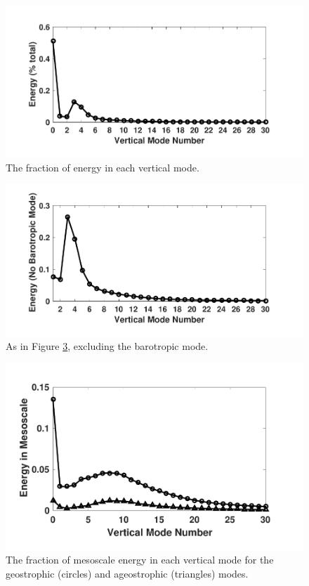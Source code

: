 \begin{figure}[H]
\includegraphics[scale=1]{Chapter4/img/modal_energy}
\caption{The fraction of energy in each vertical mode.}
\label{fig:modal_energy}
\end{figure}
\vspace{-0.2in}
\begin{figure}[H]
\includegraphics[scale=1]{Chapter4/img/modal_energy_nobaro}
\caption{As in Figure \ref{fig:meso_GeoAgeo},  excluding the barotropic mode.}
\label{fig:modal_energy_nobaro}
\end{figure}

\begin{figure}[H]
\vspace{0cm}
\includegraphics[scale=1]{Chapter4/img/meso_GeoAgeo}
\vspace{0cm}
\caption{The fraction of mesoscale energy in each vertical mode for the geostrophic (circles) and ageostrophic (triangles) modes.}
\label{fig:meso_GeoAgeo}
\end{figure}

